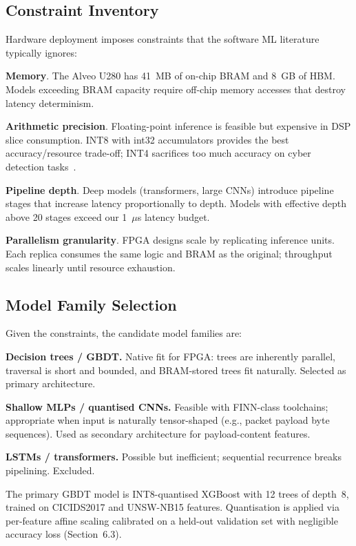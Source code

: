 \documentclass[sigconf,nonacm]{acmart}
\begin{document}
\subsection{Constraint Inventory}

Hardware deployment imposes constraints that the software ML literature
typically ignores:

\textbf{Memory}. The Alveo U280 has 41~MB of on-chip BRAM and 8~GB of
HBM. Models exceeding BRAM capacity require off-chip memory accesses
that destroy latency determinism.

\textbf{Arithmetic precision}. Floating-point inference is feasible but
expensive in DSP slice consumption. INT8 with int32 accumulators
provides the best accuracy/resource trade-off; INT4 sacrifices too much
accuracy on cyber detection tasks~\cite{nakahara2024hwml}.

\textbf{Pipeline depth}. Deep models (transformers, large CNNs)
introduce pipeline stages that increase latency proportionally to
depth. Models with effective depth above 20 stages exceed our 1~$\mu$s
latency budget.

\textbf{Parallelism granularity}. FPGA designs scale by replicating
inference units. Each replica consumes the same logic and BRAM as the
original; throughput scales linearly until resource exhaustion.

\subsection{Model Family Selection}

Given the constraints, the candidate model families are:

\textbf{Decision trees / GBDT.} Native fit for FPGA: trees are
inherently parallel, traversal is short and bounded, and BRAM-stored
trees fit naturally. Selected as primary architecture.

\textbf{Shallow MLPs / quantised CNNs.} Feasible with FINN-class
toolchains; appropriate when input is naturally tensor-shaped (e.g.,
packet payload byte sequences). Used as secondary architecture for
payload-content features.

\textbf{LSTMs / transformers.} Possible but inefficient; sequential
recurrence breaks pipelining. Excluded.

The primary GBDT model is INT8-quantised XGBoost with 12 trees of
depth~8, trained on CICIDS2017 and UNSW-NB15 features. Quantisation is
applied via per-feature affine scaling calibrated on a held-out
validation set with negligible accuracy loss (Section~6.3).
\end{document}
